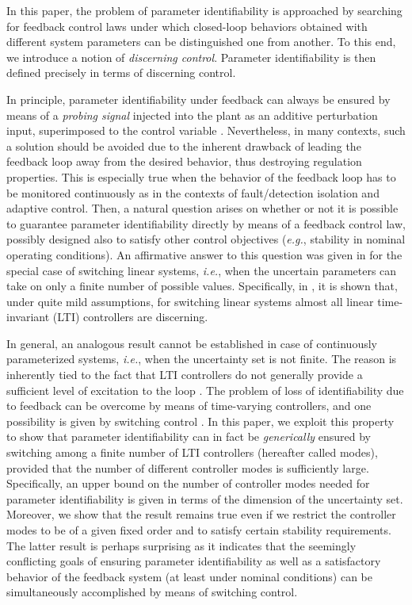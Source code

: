 \documentclass[letterpaper, 10 pt, conference]{ieeetran}
\begin{document}
In this paper, the problem of parameter identifiability 
is approached by searching for feedback control laws 
under which closed-loop behaviors obtained 
with different system parameters can be distinguished one from another.
To this end, we introduce a notion of \emph{discerning control}.
Parameter identifiability is then defined precisely in terms of 
discerning control.


In principle, parameter identifiability 
under feedback can always be ensured by means 
of a \emph{probing signal} injected into the plant as an additive perturbation input, 
superimposed to the control variable \cite{Astrom,Ioannou}. Nevertheless, in many contexts, such a solution should be avoided due to the inherent drawback of leading the feedback loop away from the desired behavior,
thus destroying regulation properties. This is especially true when the behavior of the feedback loop has to be monitored continuously as in the contexts of fault/detection isolation and adaptive control.
Then, a natural question arises on whether or not it is possible to guarantee parameter identifiability directly by means of a feedback control law, possibly designed also to satisfy
other control objectives (\emph{e.g.}, stability in nominal operating conditions). 
An affirmative answer to this question was given in \cite{Ba13,BaBaTe14} for the special case
of switching linear systems, \emph{i.e.}, when the uncertain parameters can take on only a finite number of possible values. Specifically, in \cite{Ba13,BaBaTe14}, it is shown that, under quite mild assumptions, for switching linear systems almost all linear time-invariant (LTI) controllers are discerning. 

In general, an analogous result cannot be established in case of 
continuously parameterized systems, \emph{i.e.}, when the uncertainty set is not finite.
The reason is inherently tied to the fact that LTI controllers do not generally 
provide a sufficient level of excitation to the loop \cite[Chapter 2]{Astrom}.
The problem of loss of identifiability due to feedback can be overcome 
by means of time-varying controllers, and one possibility 
is given by switching control \cite{MOPA,MOPA2}. 
In this paper, we exploit this property
to show that parameter identifiability can in fact be \emph{generically} ensured by 
switching among a finite number of LTI controllers (hereafter called modes), provided that the number of different controller modes is sufficiently large. 
Specifically, an upper bound on the number of controller modes needed for parameter identifiability is given in terms of the dimension of the uncertainty set.
Moreover, we show that the result remains
true even if we restrict the controller modes to be of a given fixed order
and to satisfy certain stability requirements. 
The latter result is perhaps surprising as it indicates that
the seemingly conflicting goals of ensuring parameter identifiability as well as a satisfactory behavior of the feedback system (at least under nominal conditions) 
can be simultaneously accomplished by means of switching control. 
\end{document}
